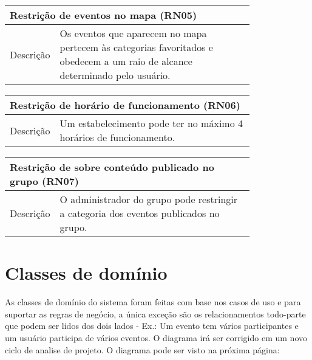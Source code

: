 \documentclass{article}
\begin{document}
				\begin{center}
			   	 \begin{tabular}{|l|p{0.8\linewidth}|}
				\hline
			 	\multicolumn{2}{|p{\textwidth}|}{
					{\large \textbf{Restrição de eventos no mapa (RN05)}}
				}  \\
				\hline
			
				Descrição & Os eventos que aparecem no mapa pertecem às categorias favoritados e obedecem a um raio de alcance determinado pelo usuário. \\ 
			   
			    	\hline
			   	 \end{tabular} 
			    	\end{center}
			
				\begin{center}
			   	 \begin{tabular}{|l|p{0.8\linewidth}|}
				\hline
			 	\multicolumn{2}{|p{\textwidth}|}{
					{\large \textbf{Restrição de horário de funcionamento (RN06)}}
				}  \\
				\hline
			
				Descrição & Um estabelecimento pode ter no máximo 4 horários de funcionamento. \\ 
			   
			    	\hline
			   	\end{tabular} 
			    \end{center}
			    
			    \begin{center}
			   	 \begin{tabular}{|l|p{0.8\linewidth}|}
				\hline
			 	\multicolumn{2}{|p{\textwidth}|}{
					{\large \textbf{Restrição de sobre conteúdo publicado no grupo (RN07)}}
				}  \\
				\hline
			
				Descrição & O administrador do grupo pode restringir a categoria dos eventos publicados no grupo. \\ 
			   
			    	\hline
			   	\end{tabular} 
			    \end{center}
			    
			
			
			
				\section{Classes de domínio} \bigskip
			As classes de domínio do sistema foram feitas com base nos casos de uso e para suportar as regras de negócio, a única exceção são os relacionamentos todo-parte que podem ser lidos dos dois lados - Ex.: Um evento tem vários participantes e um usuário participa de vários eventos. O diagrama irá ser corrigido em um novo ciclo de analise de projeto. O diagrama pode ser visto na próxima página:
			 
\end{document}
